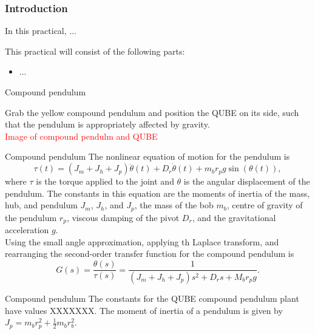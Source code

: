 \documentclass[9pt]{beamer-control}
\begin{document}

\begin{frame}
\frametitle{Introduction}
In this practical, ...

\vfill

This practical will consist of the following parts:
\begin{itemize}
\item ...
\end{itemize}
\end{frame}


\begin{frame}{Compound pendulum}
	
Grab the yellow compound pendulum and position the QUBE on its side, such that the pendulum is appropriately affected by gravity.\\

\textcolor{red}{Image of compound pendulm and QUBE}

\end{frame}


\begin{frame}{Compound pendulum}
The nonlinear equation of motion for the pendulum is 
\[\tau(t) = (J_m+J_h+J_p) \ddot{\theta}(t) + D_r \dot{\theta}(t) + m_b r_p g \sin \left(\theta (t)\right), \]
where $\tau$ is the torque applied to the joint and $\theta$ is the angular displacement of the pendulum. The constants in this equation are the moments of inertia of the mass, hub, and pendulum $J_m$, $J_h$, and $J_p$, the mass of the bob $m_b$, centre of gravity of the pendulum $r_p$, viscous damping of the pivot $D_r$, and the gravitational acceleration $g$.\\

Using the small angle approximation, applying th Laplace transform, and rearranging the second-order transfer function for the compound pendulum is 
\[ G(s) = \frac{\theta(s)}{\tau (s)} = \frac{1}{(J_m+J_h+J_p)s^2 + D_r s + M_b r_p g } .\]

\end{frame}


\begin{frame}{Compound pendulum}
The constants for the QUBE compound pendulum plant have values XXXXXXX.
The moment of inertia of a pendulum is given by $J_p = m_b r_p^2+ \tfrac{1}{2}m_b r_b^2$.


\end{frame}
\end{document}
